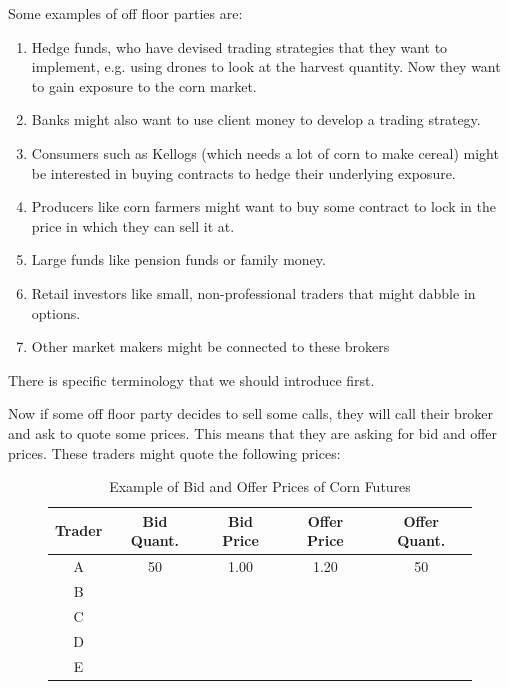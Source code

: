 \documentclass{article}
\begin{document}
    \begin{example}
      Some examples of off floor parties are: 
      \begin{enumerate}
        \item Hedge funds, who have devised trading strategies that they want to implement, e.g. using drones to look at the harvest quantity. Now they want to gain exposure to the corn market. 
        \item Banks might also want to use client money to develop a trading strategy. 
        \item Consumers such as Kellogs (which needs a lot of corn to make cereal) might be interested in buying contracts to hedge their underlying exposure. 
        \item Producers like corn farmers might want to buy some contract to lock in the price in which they can sell it at. 
        \item Large funds like pension funds or family money. 
        \item Retail investors like small, non-professional traders that might dabble in options.  
        \item Other market makers might be connected to these brokers
      \end{enumerate}
    \end{example}

    There is specific terminology that we should introduce first. 

    \begin{definition}
      
    \end{definition}
    Now if some off floor party decides to sell some calls, they will call their broker and ask to quote some prices. This means that they are asking for bid and offer prices. These traders might quote the following prices: 

    \begin{figure}[H]
      \centering 
      \begin{table}
        \centering
        \caption{Example of Bid and Offer Prices of Corn Futures}
        \begin{tabular}{|c|c|c|c|c|}
          \hline
          Trader & Bid Quant. & Bid Price & Offer Price & Offer Quant. \\
          \hline
          A & 50 & 1.00 & 1.20 & 50 \\
          \hline
          B & & & &  \\
          \hline
          C & & & & \\
          \hline
          D & & & &  \\
          \hline
          E & & & & \\
          \hline
        \end{tabular}
        \label{table:bid_offer}
      \end{table}
      \caption{} 
      \label{fig:}
    \end{figure}
\end{document}
